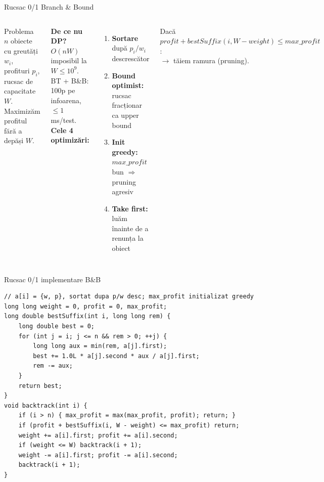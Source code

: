 ﻿\documentclass[10pt]{beamer}
\begin{document}
\begin{frame}{Rucsac 0/1 \textemdash{} Branch \& Bound}
  \begin{columns}[T]
  \begin{block}{Problema}
    $n$ obiecte cu greutăți $w_i$, profituri $p_i$, rucsac de capacitate $W$.
    Maximizăm profitul fără a depăși $W$.
  \end{block}
  \textbf{De ce nu DP?} $O(nW)$ \textemdash{} imposibil la $W \leq 10^9$.\\
  BT + B\&B: 100p pe infoarena, $\leq 1\,$ms/test.
  \textbf{Cele 4 optimizări:}
  \begin{enumerate}\itemsep2pt
    \item \textbf{Sortare} după $p_i/w_i$ descrescător
    \item \textbf{Bound optimist:} rucsac fracționar ca upper bound
    \item \textbf{Init greedy:} $\mathit{max\_profit}$ bun $\Rightarrow$ pruning agresiv
    \item \textbf{Take first:} luăm înainte de a renunța la obiect
  \end{enumerate}
  \smallskip
  Dacă $\mathit{profit} + \mathit{bestSuffix}(i, W{-}\mathit{weight}) \leq \mathit{max\_profit}$:\\
  \hspace{1em}$\rightarrow$ tăiem ramura (pruning).
  \end{columns}
\end{frame}

\begin{frame}[fragile]{Rucsac 0/1 \textemdash{} implementare B\&B}
  \begin{lstlisting}
// a[i] = {w, p}, sortat dupa p/w desc; max_profit initializat greedy
long long weight = 0, profit = 0, max_profit;
long double bestSuffix(int i, long long rem) {
    long double best = 0;
    for (int j = i; j <= n && rem > 0; ++j) {
        long long aux = min(rem, a[j].first);
        best += 1.0L * a[j].second * aux / a[j].first;
        rem -= aux;
    }
    return best;
}
void backtrack(int i) {
    if (i > n) { max_profit = max(max_profit, profit); return; }
    if (profit + bestSuffix(i, W - weight) <= max_profit) return;
    weight += a[i].first; profit += a[i].second;
    if (weight <= W) backtrack(i + 1);
    weight -= a[i].first; profit -= a[i].second;
    backtrack(i + 1);
}
  \end{lstlisting}
\end{frame}
\end{document}
